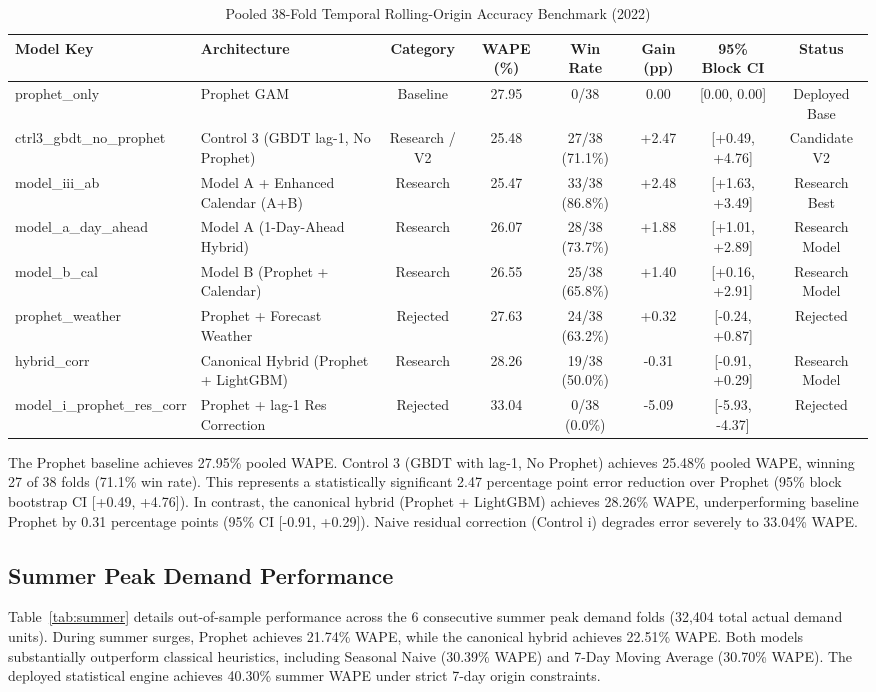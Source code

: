 \documentclass[conference]{IEEEtran}
\begin{document}
\begin{table}[!t]
\centering
\caption{Pooled 38-Fold Temporal Rolling-Origin Accuracy Benchmark (2022)}
\label{tab:38fold}
\footnotesize
\setlength{\tabcolsep}{3.5pt}
\begin{tabular}{llcccccc}
\toprule
\textbf{Model Key} & \textbf{Architecture} & \textbf{Category} & \textbf{WAPE (\%)} & \textbf{Win Rate} & \textbf{Gain (pp)} & \textbf{95\% Block CI} & \textbf{Status} \\
\midrule
prophet\_only & Prophet GAM & Baseline & 27.95 & 0/38 & 0.00 & [0.00, 0.00] & Deployed Base \\
ctrl3\_gbdt\_no\_prophet & Control 3 (GBDT lag-1, No Prophet) & Research / V2 & 25.48 & 27/38 (71.1\%) & +2.47 & [+0.49, +4.76] & Candidate V2 \\
model\_iii\_ab & Model A + Enhanced Calendar (A+B) & Research & 25.47 & 33/38 (86.8\%) & +2.48 & [+1.63, +3.49] & Research Best \\
model\_a\_day\_ahead & Model A (1-Day-Ahead Hybrid) & Research & 26.07 & 28/38 (73.7\%) & +1.88 & [+1.01, +2.89] & Research Model \\
model\_b\_cal & Model B (Prophet + Calendar) & Research & 26.55 & 25/38 (65.8\%) & +1.40 & [+0.16, +2.91] & Research Model \\
prophet\_weather & Prophet + Forecast Weather & Rejected & 27.63 & 24/38 (63.2\%) & +0.32 & [-0.24, +0.87] & Rejected \\
hybrid\_corr & Canonical Hybrid (Prophet + LightGBM) & Research & 28.26 & 19/38 (50.0\%) & -0.31 & [-0.91, +0.29] & Research Model \\
model\_i\_prophet\_res\_corr & Prophet + lag-1 Res Correction & Rejected & 33.04 & 0/38 (0.0\%) & -5.09 & [-5.93, -4.37] & Rejected \\
\bottomrule
\end{tabular}
\end{table}

The Prophet baseline achieves 27.95\% pooled WAPE. Control 3 (GBDT with lag-1, No Prophet) achieves 25.48\% pooled WAPE, winning 27 of 38 folds (71.1\% win rate). This represents a statistically significant 2.47 percentage point error reduction over Prophet (95\% block bootstrap CI [+0.49, +4.76]). In contrast, the canonical hybrid (Prophet + LightGBM) achieves 28.26\% WAPE, underperforming baseline Prophet by 0.31 percentage points (95\% CI [-0.91, +0.29]). Naive residual correction (Control i) degrades error severely to 33.04\% WAPE.

\subsection{Summer Peak Demand Performance}
Table~\ref{tab:summer} details out-of-sample performance across the 6 consecutive summer peak demand folds (32,404 total actual demand units). During summer surges, Prophet achieves 21.74\% WAPE, while the canonical hybrid achieves 22.51\% WAPE. Both models substantially outperform classical heuristics, including Seasonal Naive (30.39\% WAPE) and 7-Day Moving Average (30.70\% WAPE). The deployed statistical engine achieves 40.30\% summer WAPE under strict 7-day origin constraints.
\end{document}
